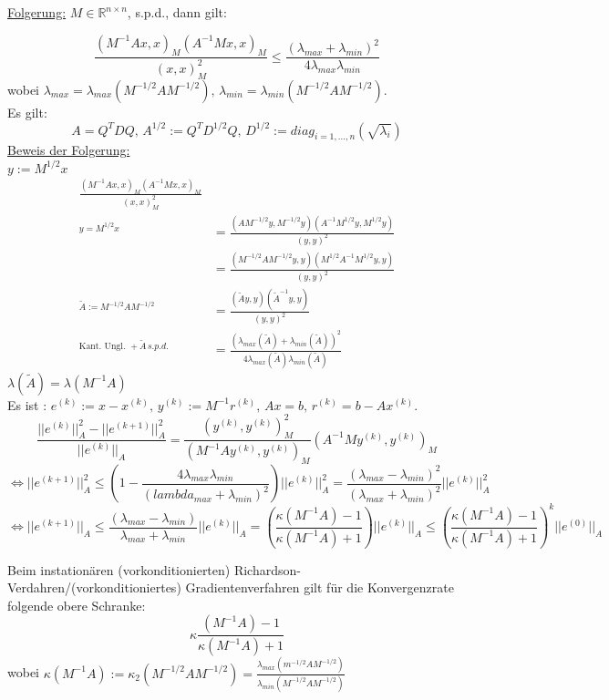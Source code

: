 \underline{Folgerung:} $M \in \mathbb{R}^{n \times n}$, s.p.d., dann gilt:

\[\frac{ (M^{-1}Ax,x)_M(A^{-1}Mx,x)_M}{(x,x)^2_M } \leq \frac{(\lambda_{max} + \lambda_{min})^2}{4\lambda_{max}\lambda_{min}} \]
wobei $\lambda_{max}=\lambda_{max}(M^{-1/2}AM^{-1/2}),\, \lambda_{min}=\lambda_{min}(M^{-1/2}AM^{-1/2})$.\\
Es gilt:
\[ A=Q^TDQ,\, A^{1/2}:=Q^TD^{1/2}Q,\, D^{1/2}:=diag_{i=1,\dots, n} ( \sqrt{\lambda_i}) \]
\underline{Beweis der Folgerung:}\\
$y:=M^{1/2}x$
\begin{align*}
  \frac{(M^{-1}Ax,x)_M(A^{-1}Mx,x)_M}{(x,x)^2_M} \\
  ^{y=M^{1/2}x} &= \frac{ (AM^{-1/2}y,M^{-1/2}y)(A^{-1}M^{1/2}y,M^{1/2}y)}{(y,y)^2} \\
  &= \frac{ (M^{-1/2}AM^{-1/2}y,y)(M^{1/2}A^{-1}M^{1/2}y,y)}{(y,y)^2} \\
  ^{\tilde A:=M^{-1/2}AM^{-1/2}} &= \frac{(\tilde A y ,y)(\tilde A^{-1}y,y)}{(y,y)^2} \\
  ^{\text{Kant. Ungl. } + \tilde A \, s.p.d.} &= \frac{(\lambda_{max}(\tilde A) + \lambda_{min}(\tilde A))^2}{4\lambda_{max}(\tilde A)\lambda_{min}(\tilde A)}
\end{align*}
$\lambda(\tilde A)=\lambda (M^{-1}A)$ \\
Es ist : $ e^{(k)}:= x-x^{(k)},\, y^{(k)}:= M^{-1}r^{(k)},\, Ax=b,\, r^{(k)}=b-Ax^{(k)}$.
\[ \frac{||e^{(k)}||^2_A - ||e^{(k+1)}||^2_A}{||e^{(k)}||_A} =\frac{(y^{(k)},y^{(k)})^2_M}{(M^{-1}Ay^{(k)},y^{(k)})_M}(A^{-1}My^{(k)},y^{(k)})_M \]
\[\Leftrightarrow ||e^{(k+1)}||^2_A \leq \left( 1-\frac{4\lambda_{max}\lambda_{min}}{(lambda_{max}+\lambda_{min})^2}\right) ||e^{(k)}||^2_A = \frac{(\lambda_{max}-\lambda_{min})^2}{(\lambda_{max}+\lambda_{min})^2} ||e^{(k)}||^2_A \]
\[ \Leftrightarrow || e^{(k+1)}||_A \leq \frac{(\lambda_{max} - \lambda_{min})}{\lambda_{max} + \lambda_{min}} ||e^{(k)}||_A = \left( \frac{\kappa (M^{-1}A) -1 }{\kappa (M^{-1}A)+1} \right) ||e^{(k)}||_A \leq \left( \frac{\kappa (M^{-1}A) -1 }{\kappa (M^{-1}A)+1} \right)^k ||e^{(0)}||_A \]

\begin{satz}
  Beim instationären (vorkonditionierten) Richardson-Verdahren/(vorkonditioniertes) Gradientenverfahren gilt für die Konvergenzrate folgende obere Schranke:
  \begin{equation}
    \kappa \frac{(M^{-1}A)-1}{\kappa(M^{-1}A)+1}
  \end{equation}
  wobei $\kappa(M^{-1}A):= \kappa_2(M^{-1/2}AM^{-1/2}) = \frac{\lambda_{max}(m^{-1/2}AM^{-1/2})}{\lambda_{min}(M^{-1/2}AM^{-1/2})}$
\end{satz}

